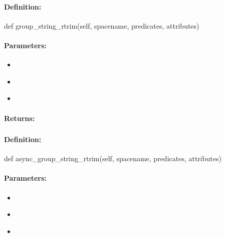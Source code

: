 \paragraph{Definition:}
\begin{pythoncode}
def group_string_rtrim(self, spacename, predicates, attributes)
\end{pythoncode}

\paragraph{Parameters:}
\begin{itemize}[noitemsep]
\item {}\\

\item {}\\

\item {}\\

\end{itemize}

\paragraph{Returns:}


\pagebreak
\subsubsection{}
\label{api:python:async_group_string_rtrim}


\paragraph{Definition:}
\begin{pythoncode}
def async_group_string_rtrim(self, spacename, predicates, attributes)
\end{pythoncode}

\paragraph{Parameters:}
\begin{itemize}[noitemsep]
\item {}\\

\item {}\\

\item {}\\

\end{itemize}

